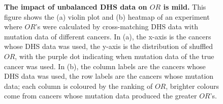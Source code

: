 \begin{figure}[htbp]
    \caption{\textbf{The impact of unbalanced DHS data on $OR$ is mild.} This figure shows the (a) violin plot and (b) heatmap of an experiment where $OR$'s were calculated by cross-matching DHS data with mutation data of different cancers. In (a), the x-axis is the cancers whose DHS data was used, the y-axis is the distribution of shuffled $OR$, with the purple dot indicating when mutation data of the true cancer was used. In (b), the column labels are the cancers whose DHS data was used, the row labels are the cancers whose mutation data; each column is coloured by the ranking of $OR$, brighter colours come from cancers whose mutation data produced the greater $OR$'s.}
    \label{fig:mixed_or}
\end{figure}